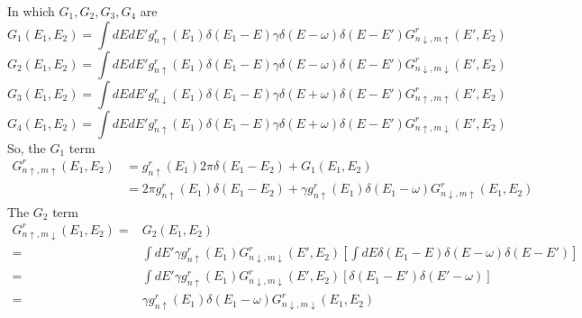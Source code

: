 \documentclass[11pt,a4paper]{article}
\begin{document}
In which $G_{1}, G_{2}, G_{3}, G_{4}$ are
\begin{equation}
G_{1}(E_{1},E_{2}) = \int dE dE' g_{n \uparrow}^{r}\left(E_{1}\right) \delta(E_{1}-E)\gamma\delta(E-\omega)\delta(E-E') G_{n \downarrow, m \uparrow}^{r}(E',E_{2})
\end{equation}
\begin{equation}
G_{2}(E_{1},E_{2}) = \int dE dE'  g_{n \uparrow}^{r} \left(E_{1}\right) \delta(E_{1}-E) \gamma\delta(E-\omega)\delta(E-E') G_{n \downarrow, m \downarrow}^{r}(E',E_{2})
\end{equation}
\begin{equation}
G_{3}(E_{1},E_{2}) = \int dE dE'  g_{n \downarrow}^{r}\left(E_{1}\right) \delta(E_{1}-E)  \gamma\delta(E+\omega) \delta(E-E') G_{n \uparrow, m \uparrow}^{r}(E',E_{2})
\end{equation}
\begin{equation}
G_{4}(E_{1},E_{2}) = \int dE dE'  g_{n \uparrow}^{r}\left(E_{1}\right) \delta(E_{1}-E) \gamma\delta(E+\omega) \delta(E-E') G_{n \uparrow, m \downarrow}^{r}(E',E_{2})
\end{equation}
So, the $G_{1}$ term
\begin{equation}
\begin{split}
G_{n \uparrow, m \uparrow}^{r}(E_{1}, E_{2}) &= g_{n \uparrow}^{r}\left(E_{1}\right) 2 \pi \delta\left(E_{1}-E_{2}\right) + G_{1}\left(E_{1}, E_{2}\right) \\
&= 2 \pi g_{n \uparrow}^{r}\left(E_{1}\right) \delta\left(E_{1}-E_{2}\right) + \gamma g_{n \uparrow}^{r}\left(E_{1}\right) \delta(E_{1}-\omega) G_{n \downarrow, m \uparrow}^{r}\left(E_{1}, E_{2}\right)
\end{split}
\end{equation}
The $G_{2}$ term
\begin{equation}
\begin{split}
G_{n \uparrow, m \downarrow}^{r}\left(E_{1}, E_{2}\right) =& G_{2}\left(E_{1}, E_{2}\right) \\
=& \int dE'\gamma g_{n \uparrow}^{r} \left(E_{1}\right)  G_{n \downarrow, m \downarrow}^{r}(E',E_{2}) \left[ \int dE   \delta(E_{1}-E) \delta(E-\omega)\delta(E-E')\right] \\
=& \int dE'\gamma g_{n \uparrow}^{r} \left(E_{1}\right)  G_{n \downarrow, m \downarrow}^{r}(E',E_{2}) \left[ \delta(E_{1}-E') \delta(E'-\omega)\right] \\
=& \gamma g_{n \uparrow}^{r} \left(E_{1}\right) \delta(E_{1}-\omega) G_{n \downarrow, m \downarrow}^{r}(E_{1},E_{2})
\end{split}
\end{equation}
\end{document}
